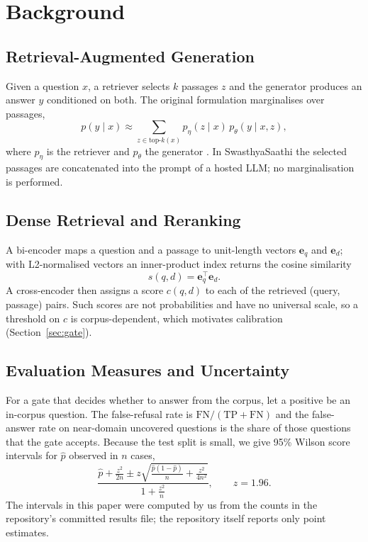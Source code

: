 \documentclass[10pt,a4paper]{article}
\begin{document}
\section{Background}
\subsection{Retrieval-Augmented Generation}
Given a question $x$, a retriever selects $k$ passages $z$ and the generator produces an answer $y$ conditioned on both. The original formulation marginalises over passages,
\begin{equation}
p(y\mid x)\approx \sum_{z\in\text{top-}k(x)} p_\eta(z\mid x)\,p_\theta(y\mid x,z),
\end{equation}
where $p_\eta$ is the retriever and $p_\theta$ the generator \citep{lewis2020}. In SwasthyaSaathi the selected passages are concatenated into the prompt of a hosted LLM; no marginalisation is performed.

\subsection{Dense Retrieval and Reranking}
A bi-encoder maps a question and a passage to unit-length vectors $\mathbf{e}_q$ and $\mathbf{e}_d$; with L2-normalised vectors an inner-product index returns the cosine similarity
\begin{equation}
s(q,d)=\mathbf{e}_q^{\top}\mathbf{e}_d .
\end{equation}
A cross-encoder then assigns a score $c(q,d)$ to each of the retrieved (query, passage) pairs. Such scores are not probabilities and have no universal scale, so a threshold on $c$ is corpus-dependent, which motivates calibration (Section~\ref{sec:gate}).

\subsection{Evaluation Measures and Uncertainty}
For a gate that decides whether to answer from the corpus, let a positive be an in-corpus question. The false-refusal rate is $\mathrm{FN}/(\mathrm{TP}+\mathrm{FN})$ and the false-answer rate on near-domain uncovered questions is the share of those questions that the gate accepts. Because the test split is small, we give 95\% Wilson score intervals \citep{wilson1927,brown2001} for $\hat p$ observed in $n$ cases,
\begin{equation}
\frac{\hat p+\frac{z^2}{2n}\pm z\sqrt{\frac{\hat p(1-\hat p)}{n}+\frac{z^2}{4n^2}}}{1+\frac{z^2}{n}},\qquad z=1.96 .
\end{equation}
The intervals in this paper were computed by us from the counts in the repository's committed results file; the repository itself reports only point estimates.
\end{document}
